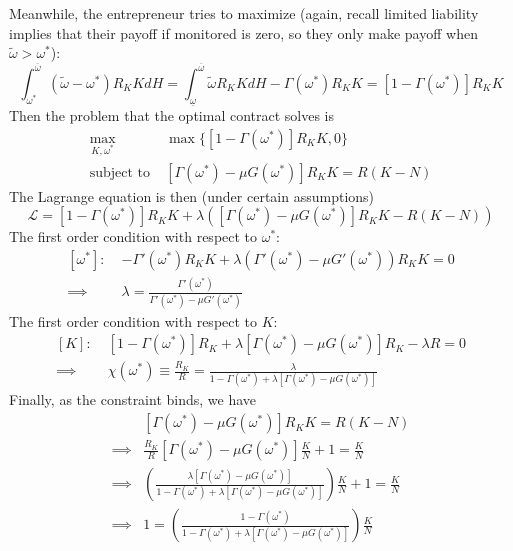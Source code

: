 \documentclass[12pt]{article}
\begin{document}
\begin{itemize}
    Meanwhile, the entrepreneur tries to maximize (again, recall limited liability implies that their payoff if monitored is zero, so they only make payoff when $\widetilde{\omega} > \omega^*$):
    \[\int_{\omega^*}^{\overline{\omega}}(\widetilde{\omega} - \omega^*)R_KKdH = \int_{\underline{\omega}}^{\overline{\omega}}\widetilde{\omega}R_KKdH - \Gamma(\omega^*)R_KK = \left[1-\Gamma(\omega^*)\right]R_KK\]
    Then the problem that the optimal contract solves is
    \[\begin{split}
        \max_{K,\omega^*}\;&\max\{\left[1-\Gamma(\omega^*)\right]R_KK, 0\} \\
        \text{subject to}\;&\left[\Gamma(\omega^*) - \mu G(\omega^*)\right]R_KK = R(K-N)
    \end{split}\]
    The Lagrange equation is then (under certain assumptions)
    \[\mathcal{L} = \left[1-\Gamma(\omega^*)\right]R_KK + \lambda\left(\left[\Gamma(\omega^*) - \mu G(\omega^*)\right]R_KK-R(K-N)\right)\]
    The first order condition with respect to $\omega^*$:
    \[\begin{split}
        [\omega^*]:\; &-\Gamma'(\omega^*)R_KK + \lambda(\Gamma'(\omega^*)-\mu G'(\omega^*))R_KK =0 \\
        \implies &\lambda = \frac{\Gamma'(\omega^*)}{\Gamma'(\omega^*) - \mu G'(\omega^*)}
    \end{split}\]
    The first order condition with respect to $K$:
    \[\begin{split}
        [K]:\; &\left[1-\Gamma(\omega^*)\right]R_K + \lambda \left[\Gamma(\omega^*) - \mu G(\omega^*)\right]R_K-\lambda R = 0 \\
        \implies &\chi(\omega^*) \equiv \frac{R_K}{R} = \frac{\lambda}{1-\Gamma(\omega^*) + \lambda \left[\Gamma(\omega^*) - \mu G(\omega^*)\right]}
    \end{split}\]
    Finally, as the constraint binds, we have
    \[\begin{split}
        &\left[\Gamma(\omega^*) - \mu G(\omega^*)\right]R_KK=R(K-N) \\
        \implies &\frac{R_K}{R}\left[\Gamma(\omega^*) - \mu G(\omega^*)\right]\frac{K}{N} + 1 = \frac{K}{N} \\
        \implies &\left(\frac{\lambda\left[\Gamma(\omega^*) - \mu G(\omega^*)\right]}{1-\Gamma(\omega^*) + \lambda \left[\Gamma(\omega^*) - \mu G(\omega^*)\right]}\right)\frac{K}{N} + 1 = \frac{K}{N} \\
        \implies &1 = \left(\frac{1-\Gamma(\omega^*)}{1-\Gamma(\omega^*) + \lambda \left[\Gamma(\omega^*) - \mu G(\omega^*)\right]}\right)\frac{K}{N} \\

\end{split}\]
\end{itemize}
\end{document}
